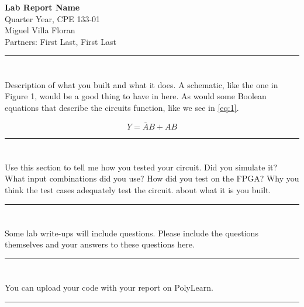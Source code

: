 \documentclass[12pt, letterpaper]{article}
\begin{document}
\begin{center}
  \large{\textbf{Lab Report Name}} \\[10pt]
  \large{Quarter Year, CPE 133-01} \\[5pt]
  \large{Miguel Villa Floran} \\[5pt]
  \large{Partners: First Last, First Last}
\end{center}

\rule{\textwidth}{0.5pt}

\section*{}

Description of what you built and what it does. A schematic, like the one in Figure 1, would be a good thing to have in here. As would some Boolean equations that describe the circuits function, like we see in \ref{eq:1}.

\begin{equation}
  Y = \overline{A}B + AB
\end{equation}

\rule{\textwidth}{0.5pt}

\section*{}

\noindent Use this section to tell me how you tested your circuit. Did you simulate it? What input combinations did 
you use? How did you test on the FPGA? Why you think the test cases adequately test the circuit.
about what it is you built.

\rule{\textwidth}{0.5pt}

\section*{}

\noindent Some lab write-ups will include questions.  Please include the questions themselves and your answers to 
these questions here.   

\rule{\textwidth}{0.5pt}

\section*{}

\noindent You can upload your code with your report on PolyLearn.

\rule{\textwidth}{0.5pt}

\printbibliography[title={\centering References}]
\end{document}
